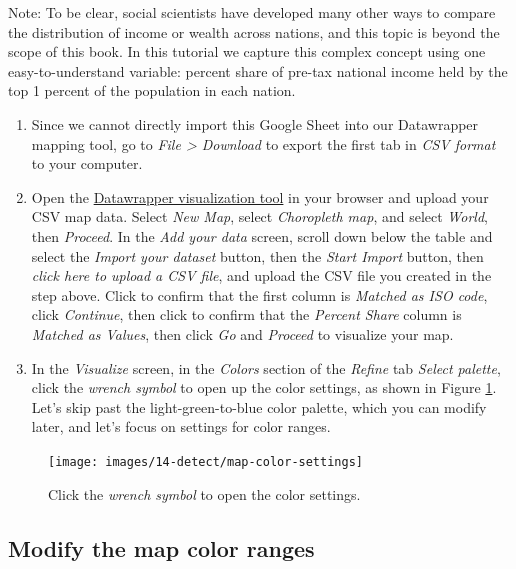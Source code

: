 \documentclass[
  english,
]{book}
\begin{document}
Note: To be clear, social scientists have developed many other ways to compare the distribution of income or wealth across nations, and this topic is beyond the scope of this book. In this tutorial we capture this complex concept using one easy-to-understand variable: percent share of pre-tax national income held by the top 1 percent of the population in each nation.

\begin{enumerate}
\def\labelenumi{\arabic{enumi}.}
\setcounter{enumi}{2}
\item
  Since we cannot directly import this Google Sheet into our Datawrapper mapping tool, go to \emph{File \textgreater{} Download} to export the first tab in \emph{CSV format} to your computer.
\item
  Open the \href{https://www.datawrapper.de}{Datawrapper visualization tool} in your browser and upload your CSV map data. Select \emph{New Map}, select \emph{Choropleth map}, and select \emph{World}, then \emph{Proceed}. In the \emph{Add your data} screen, scroll down below the table and select the \emph{Import your dataset} button, then the \emph{Start Import} button, then \emph{click here to upload a CSV file}, and upload the CSV file you created in the step above. Click to confirm that the first column is \emph{Matched as ISO code}, click \emph{Continue}, then click to confirm that the \emph{Percent Share} column is \emph{Matched as Values}, then click \emph{Go} and \emph{Proceed} to visualize your map.
\item
  In the \emph{Visualize} screen, in the \emph{Colors} section of the \emph{Refine} tab \emph{Select palette}, click the \emph{wrench symbol} to open up the color settings, as shown in Figure \ref{fig:map-color-settings}. Let's skip past the light-green-to-blue color palette, which you can modify later, and let's focus on settings for color ranges.
\end{enumerate}



\begin{figure}
\texttt{[image: images/14-detect/map-color-settings]} \caption{Click the \emph{wrench symbol} to open the color settings.}\label{fig:map-color-settings}
\end{figure}

\hypertarget{modify-the-map-color-ranges}{%
\subsection*{Modify the map color ranges}\label{modify-the-map-color-ranges}}
\end{document}
